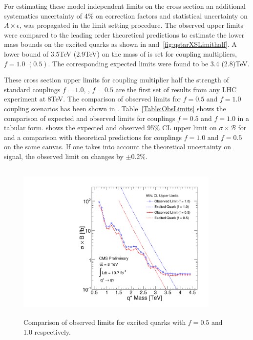 For estimating these model independent limits on the cross section an additional systematics uncertainty of 4\% on correction factors and
statistical uncertainty on $A\times\epsilon$, was propagated in the limit setting procedure. The observed upper limits were compared to the 
leading order theoretical predictions to estimate the lower mass bounds on the excited quarks as shown in \figs{\ref{fig:qstarXSLimitfull}} 
and~\ref{fig:qstarXSLimithalf}. A lower bound of 3.5\unit{TeV} (2.9\unit{TeV}) on the mass of \qstar is set for coupling multipliers, 
$f=1.0$ $(0.5)$. The corresponding expected limits were found to be 3.4 (2.8)\unit{TeV}.

These cross section upper limits for coupling multiplier half the strength of standard couplings $f=1.0$, \ie, $f=0.5$ are the first set of results
from any LHC experiment at 8\unit{TeV}. The comparison of observed limits for $f=0.5$ and $f=1.0$ coupling scenarios has been shown in 
\fig{\ref{fig:compareLimit}}. Table~\ref{Table:ObsLimits} shows the comparison of expected and observed limits for couplings $f=0.5$ and $f=1.0$ in 
a tabular form. \Fig{\ref{fig:LimitsfullHalf}} shows the expected and observed 95\% CL upper limit on $\sigma\times\mathcal{B}$ for \qstar and a 
comparison with theoretical predictions for couplings $f=1.0$ and $f=0.5$ on the same canvas. If one takes into account the theoretical uncertainty 
on signal, the observed limit on \mqstar changes by $\pm$0.2\%. 
\begin{figure}[h!]
\centering
 \includegraphics[width=10cm,height=8cm]{ch6/plots/ExcitedQuarksToGJ_Comparef0p5f1p0_ObseExp_xs_Limits_fb.pdf}
 \caption{Comparison of observed limits for excited quarks with $f=0.5$ and 1.0 respectively. }
\label{fig:compareLimit}
\end{figure}

%
%


